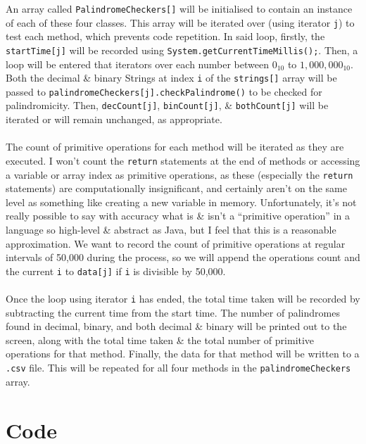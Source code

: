 \documentclass[a4paper]{article}
\begin{document}
An array called \verb|PalindromeCheckers[]| will be initialised to contain an instance of each of these four classes.
This array will be iterated over (using iterator \verb|j|) to test each method, which prevents code repetition.
In said loop, firstly, the \verb|startTime[j]| will be recorded using \verb|System.getCurrentTimeMillis();|. 
Then, a loop will be entered that iterators over each number between $0_{10}$ to $1,000,000_{10}$. 
Both the decimal \& binary Strings at index \verb|i| of the \verb|strings[]| array will be passed to \verb|palindromeCheckers[j].checkPalindrome()| to be checked for palindromicity.
Then, \verb|decCount[j]|, \verb|binCount[j]|, \& \verb|bothCount[j]| will be iterated or will remain unchanged, as appropriate.
\\\\
The count of primitive operations for each method will be iterated as they are executed.
I won't count the \verb|return| statements at the end of methods or accessing a variable or array index as primitive operations, as these (especially the \verb|return| statements) are computationally 
insignificant, and certainly aren't on the same level as something like creating a new variable in memory.
Unfortunately, it's not really possible to say with accuracy what is \& isn't a ``primitive operation'' in a language so high-level \& abstract as Java, but I feel that this is a reasonable approximation. 
We want to record the count of primitive operations at regular intervals of 50,000 during the process, so we will append the operations count and the current \verb|i| to \verb|data[j]| if \verb|i| is 
divisible by 50,000.
\\\\
Once the loop using iterator \verb|i| has ended, the total time taken will be recorded by subtracting the current time from the start time.
The number of palindromes found in decimal, binary, and both decimal \& binary will be printed out to the screen, along with the total time taken \& the total number of primitive operations for that method.
Finally, the data for that method will be written to a \verb|.csv| file. 
This will be repeated for all four methods in the \verb|palindromeCheckers| array.

\section{Code}






\end{document}
